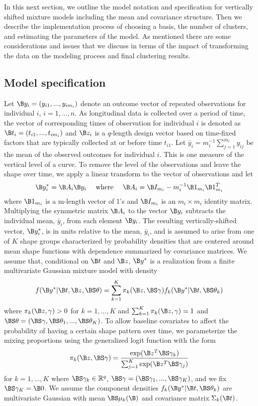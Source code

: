 In this next section, we outline the model notation and specification for vertically shifted mixture models including the mean and covariance structure. Then we describe the implementation process of choosing a basis, the number of clusters, and estimating the parameters of the model. As mentioned there are some considerations and issues that we discuss in terms of the impact of transforming the data on the modeling process and final clustering results. 
\subsection{Model specification}
 Let $\B y_{i}=(y_{i1},...,y_{im_{i}})$ denote an outcome vector of repeated observations for individual $i$, $i=1,...,n$. As longitudinal data is collected over a period of time, the vector of corresponding times of observation for individual $i$ is denoted as $\B t_{i}=(t_{i1},...,t_{im_{i}})$ and $\B z_{i}$ is a $q$-length design vector based on time-fixed factors that are typically collected at or before time $t_{i1}$. Let $\bar{y}_{i}= m_{i}^{-1}\sum^{m_{i}}_{j=1} y_{ij}$ be the mean of the observed outcomes for individual $i$. This is one measure of the vertical level of a curve. To remove the level of the observations and leave the shape over time, we apply a linear transform to the vector of observations and let
\begin{align*}
\B y^{*}_{i} = \B A_{i}\B y_{i}\quad\text{ where }\quad \B A_{i} =\B I_{m_{i}} - m_{i}^{-1}\B 1_{m_{i}}\B 1_{m_{i}}^{T}
\end{align*}
where $\B 1_{m_{i}}$ is a m-length vector of 1's and $\B I_{m_{i}}$ is an $m_{i}\times m_{i}$ identity matrix. Multiplying the symmetric matrix $\B A_{i}$ to the vector $\B y_{i}$ subtracts the individual mean, $\bar{y}_{i}$, from each element $\B y_{i}$. The resulting vertically-shifted vector, $\B y^{*}_{i}$, is in units relative to the mean, $\bar{y}_{i}$, and is assumed to arise from one of $K$ shape groups characterized by probability densities that are centered around mean shape functions with dependence summarized by covariance matrices. We assume that, conditional on $\B t$ and $\B z$, $\B y^{*}$ is a realization from a finite multivariate Gaussian mixture model with density
\begin{align*}
 f(\B y^{*}|\B t,\B z,\BS\theta) =  \sum^{K}_{k=1}\pi_{k}(\B z, \BS\gamma)f_{k}( \B y^{*}|\B t,\BS\theta_{k})
\end{align*}
where $\pi_{k}(\B z,\gamma)>0$ for $k=1,...,K$ and $\sum^{K}_{k=1}\pi_{k}(\B z,\gamma)=1$ and $\BS\theta = (\BS\gamma,\BS\theta_{1},...,\BS\theta_{K})$. To allow baseline covariates to affect the probability of having a certain shape pattern over time, we parameterize the mixing proportions using the generalized logit function with the form
$$\pi_{k}(\B z,\BS\gamma)=\frac{\exp(\B z^{T}\BS\gamma_{k})}{\sum_{j=1}^{K}\exp(\B z^{T}\BS\gamma_{j})}$$ 
for $k=1,...,K$ where $\BS \gamma_{k}\in\mathbb{R}^{q}$, $\BS\gamma = (\BS\gamma_{1},...,\BS\gamma_{K})$, and we fix $\BS\gamma_{K}=\B 0$. We assume the component densities $f_{k}(\B y^{*}|\B t,\BS\theta_{k})$ are multivariate Gaussian with mean $\BS\mu_{k}(\B )$ and covariance matrix $\Sigma_{k}(\B t)$.

